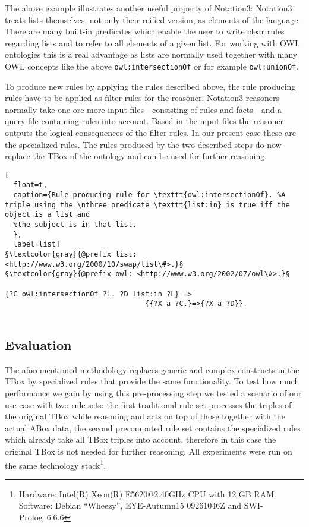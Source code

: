 The above example illustrates 
another useful property of Notation3: 
Notation3 treats lists themselves, not only their reified version, as elements of the language. There are many built-in predicates 
which enable the user to write 
clear rules regarding lists and to refer to all elements of a given list. For working with OWL ontologies this is a real advantage as lists are normally used
together with many OWL concepts 
like the above \texttt{owl:intersectionOf} or 
for example \texttt{owl:unionOf}.

To produce new rules by applying the rules described above, the rule producing rules have to be applied as filter rules for the reasoner. Notation3 reasoners
normally take one ore more input files---consisting of rules and facts---and a query file containing rules into account. Based in the input files the reasoner 
outputs the logical consequences of the filter rules. In our present case these are the specialized rules.
The rules produced by the two described steps do now replace the TBox of the ontology and can be used for further reasoning.


\begin{lstlisting}[
  float=t,
  caption={Rule-producing rule for \texttt{owl:intersectionOf}. %A triple using the \nthree predicate \texttt{list:in} is true iff the object is a list and 
  %the subject is in that list.  
  },
  label=list]
§\textcolor{gray}{@prefix list: <http://www.w3.org/2000/10/swap/list\#>.}§
§\textcolor{gray}{@prefix owl: <http://www.w3.org/2002/07/owl\#>.}§

{?C owl:intersectionOf ?L. ?D list:in ?L} => 
                                 {{?X a ?C.}=>{?X a ?D}}.
                              
\end{lstlisting}




\subsection{Evaluation}\label{ev}
The aforementioned methodology replaces generic and complex constructs in the TBox
by specialized rules that provide the same functionality.
To test how much performance we gain by using this pre-processing step
we tested a scenario of our use case with two rule sets: the first traditional rule set processes the triples of the original TBox while reasoning and 
acts on top of those together with the actual ABox data,
the second precomputed rule set contains the specialized rules which already take all TBox triples into account, 
therefore in this case the original TBox is not needed for 
further reasoning.
All experiments were run on the same technology stack\footnote{Hardware: Intel(R) Xeon(R) E5620@2.40GHz CPU with 12 GB RAM. Software: Debian ``Wheezy'', 
EYE-Autumn15 09261046Z and SWI-Prolog~6.6.6}.


